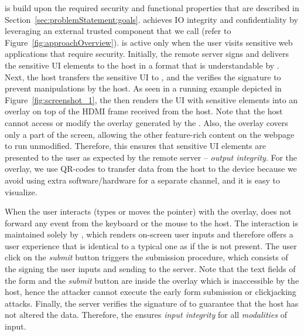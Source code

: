  \name is build upon the required security and functional properties that are described in Section~\ref{sec:problemStatement:goals}. \name achieves IO integrity and confidentiality by leveraging an external trusted component that we call \device (refer to Figure~\ref{fig:approachOverview}). 
\device is active only when the user visits sensitive web applications that require \name security.
Initially, the remote server signs and delivers the sensitive UI elements to the host in a format that is understandable by \device. Next, the host transfers the sensitive UI to \device, and the \device verifies the signature to prevent manipulations by the host. As seen in a running example depicted in Figure~\ref{fig:screenshot_1}, the \device then renders the UI with sensitive elements into an overlay on top of the HDMI frame received from the host. Note that the host cannot access or modify the overlay generated by the \device. Also, the overlay covers only a part of the screen, allowing the other feature-rich content on the webpage to run unmodified. Therefore, this ensures that sensitive UI elements are presented to the user as expected by the remote server -- \emph{output integrity}. For the overlay, we use QR-codes to transfer data from the host to the device because we avoid using extra software/hardware for a separate channel, and it is easy to visualize.

When the user interacts (types or moves the pointer) with the overlay, \device does not forward any event from the keyboard or the mouse to the host. The interaction is maintained solely by \device, which renders on-screen user inputs and therefore offers a user experience that is identical to a typical one as if the \device is not present. The user click on the \emph{submit} button triggers the submission procedure, which consists of the \device signing the user inputs and sending to the server. Note that the text fields of the form and the \emph{submit} button are inside the overlay which is inaccessible by the host, hence the attacker cannot execute the early form submission or clickjacking attacks. Finally, the server verifies the signature of \device to guarantee that the host has not altered the data. Therefore, the \device ensures \emph{input integrity} for all \emph{modalities} of input.


